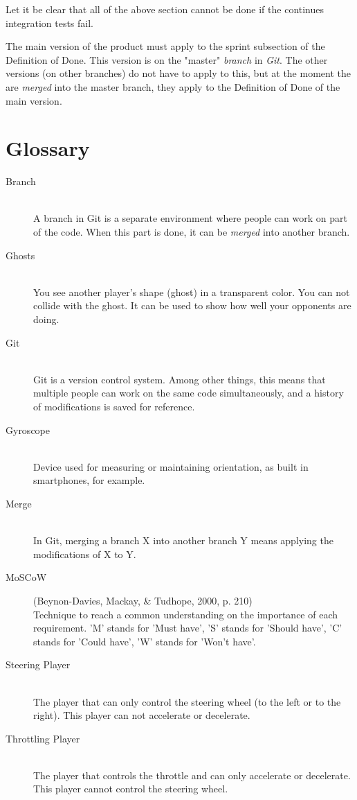\documentclass[11pt,twoside,a4paper]{article}
\begin{document}
\noindent
Let it be clear that all of the above section cannot be done if the continues integration tests fail.

The main version of the product must apply to the sprint subsection of the Definition of Done. This version is on the "master" \emph{branch} in \emph{Git}. The other versions (on other branches) do not have to apply to this, but at the moment the are \emph{merged} into the master branch, they apply to the Definition of Done of the main version.


\newpage

\section{Glossary}

\begin{description}

\item[Branch] \hfill \\
A branch in Git is a separate environment where people can work on part of the code. When this part is done, it can be \emph{merged} into another branch.

\item[Ghosts] \hfill \\
You see another player's shape (ghost) in a transparent color. You can not collide with the ghost. It can be used to show how well your opponents are doing.

\item[Git] \hfill \\
Git is a version control system. Among other things, this means that multiple people can work on the same code simultaneously, and a history of modifications is saved for reference.

\item[Gyroscope] \hfill \\
Device used for measuring or maintaining orientation, as built in smartphones, for example.

\item[Merge] \hfill \\
In Git, merging a branch X into another branch Y means applying the modifications of X to Y.

\item[MoSCoW] (Beynon-Davies, Mackay, \& Tudhope, 2000, p. 210) \hfill \\
Technique to reach a common understanding on the importance of each requirement. 'M' stands for 'Must have', 'S' stands for 'Should have', 'C' stands for 'Could have', 'W' stands for 'Won't have'.

\item[Steering Player] \hfill \\
The player that can only control the steering wheel (to the left or to the right). This player can not accelerate or decelerate.

\item[Throttling Player] \hfill \\
The player that controls the throttle and can only accelerate or decelerate. This player cannot control the steering wheel.

\end{description}
\end{document}
